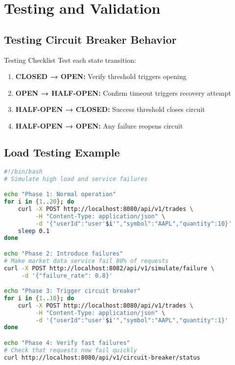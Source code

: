 \documentclass[12pt,a4paper]{article}
\begin{document}
\section{Testing and Validation}

\subsection{Testing Circuit Breaker Behavior}

\begin{interactivebox}{Testing Checklist}
Test each state transition:
\begin{enumerate}
    \item \textbf{CLOSED → OPEN:} Verify threshold triggers opening
    \item \textbf{OPEN → HALF-OPEN:} Confirm timeout triggers recovery attempt
    \item \textbf{HALF-OPEN → CLOSED:} Success threshold closes circuit
    \item \textbf{HALF-OPEN → OPEN:} Any failure reopens circuit
\end{enumerate}
\end{interactivebox}

\subsection{Load Testing Example}

\begin{lstlisting}[language=bash, caption=Circuit Breaker Load Test]
#!/bin/bash
# Simulate high load and service failures

echo "Phase 1: Normal operation"
for i in {1..20}; do
    curl -X POST http://localhost:8080/api/v1/trades \
         -H "Content-Type: application/json" \
         -d '{"userId":"user'$i'","symbol":"AAPL","quantity":10}'
    sleep 0.1
done

echo "Phase 2: Introduce failures"
# Make market data service fail 80% of requests
curl -X POST http://localhost:8082/api/v1/simulate/failure \
     -d '{"failure_rate": 0.8}'

echo "Phase 3: Trigger circuit breaker"
for i in {1..10}; do
    curl -X POST http://localhost:8080/api/v1/trades \
         -H "Content-Type: application/json" \
         -d '{"userId":"user'$i'","symbol":"AAPL","quantity":1}'
done

echo "Phase 4: Verify fast failures"
# Check that requests now fail quickly
curl http://localhost:8080/api/v1/circuit-breaker/status
\end{lstlisting}
\end{document}

